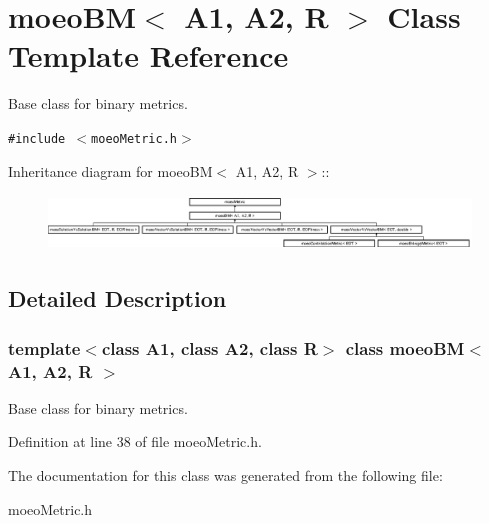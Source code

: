 \section{moeo\-BM$<$ A1, A2, R $>$ Class Template Reference}
\label{classmoeoBM}
Base class for binary metrics.  


{\tt \#include $<$moeo\-Metric.h$>$}

Inheritance diagram for moeo\-BM$<$ A1, A2, R $>$::\begin{figure}[H]
\begin{center}
\leavevmode
\includegraphics[height=1.45928cm]{classmoeoBM}
\end{center}
\end{figure}


\subsection{Detailed Description}
\subsubsection*{template$<$class A1, class A2, class R$>$ class moeo\-BM$<$ A1, A2, R $>$}

Base class for binary metrics. 



Definition at line 38 of file moeo\-Metric.h.

The documentation for this class was generated from the following file:\begin{CompactItemize}
\item 
moeo\-Metric.h\end{CompactItemize}
